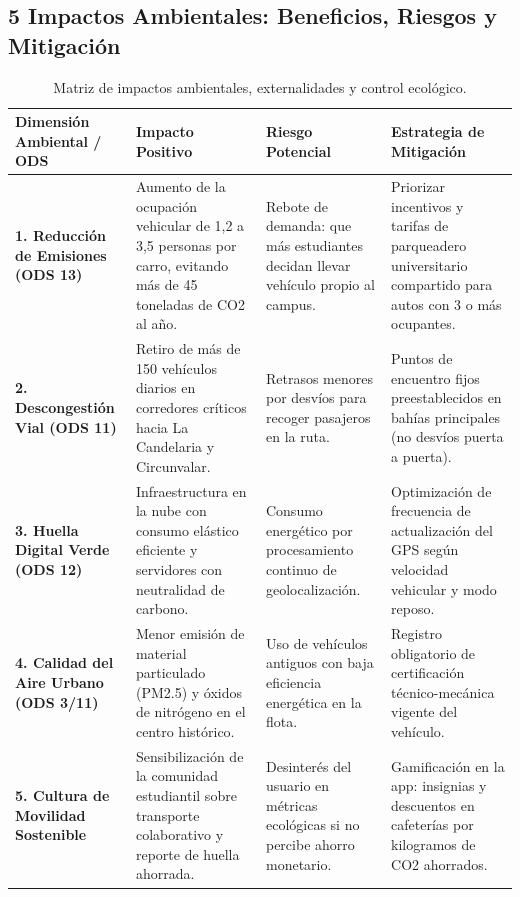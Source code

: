 \documentclass[11pt,a4paper]{article}
\begin{document}
\subsection{5 Impactos Ambientales: Beneficios, Riesgos y Mitigación}

\begin{table}[h!]
\centering
\scriptsize
\begin{tabularx}{\textwidth}{p{3.2cm} p{4.2cm} p{3.5cm} X}
\toprule
\textbf{Dimensión Ambiental / ODS} & \textbf{Impacto Positivo} & \textbf{Riesgo Potencial} & \textbf{Estrategia de Mitigación} \\
\midrule
\textbf{1. Reducción de Emisiones (ODS 13)} & Aumento de la ocupación vehicular de 1,2 a 3,5 personas por carro, evitando más de 45 toneladas de CO2 al año. & Rebote de demanda: que más estudiantes decidan llevar vehículo propio al campus. & Priorizar incentivos y tarifas de parqueadero universitario compartido para autos con 3 o más ocupantes. \\
\midrule
\textbf{2. Descongestión Vial (ODS 11)} & Retiro de más de 150 vehículos diarios en corredores críticos hacia La Candelaria y Circunvalar. & Retrasos menores por desvíos para recoger pasajeros en la ruta. & Puntos de encuentro fijos preestablecidos en bahías principales (no desvíos puerta a puerta). \\
\midrule
\textbf{3. Huella Digital Verde (ODS 12)} & Infraestructura en la nube con consumo elástico eficiente y servidores con neutralidad de carbono. & Consumo energético por procesamiento continuo de geolocalización. & Optimización de frecuencia de actualización del GPS según velocidad vehicular y modo reposo. \\
\midrule
\textbf{4. Calidad del Aire Urbano (ODS 3/11)} & Menor emisión de material particulado (PM2.5) y óxidos de nitrógeno en el centro histórico. & Uso de vehículos antiguos con baja eficiencia energética en la flota. & Registro obligatorio de certificación técnico-mecánica vigente del vehículo. \\
\midrule
\textbf{5. Cultura de Movilidad Sostenible} & Sensibilización de la comunidad estudiantil sobre transporte colaborativo y reporte de huella ahorrada. & Desinterés del usuario en métricas ecológicas si no percibe ahorro monetario. & Gamificación en la app: insignias y descuentos en cafeterías por kilogramos de CO2 ahorrados. \\
\bottomrule
\end{tabularx}
\caption{Matriz de impactos ambientales, externalidades y control ecológico.}
\end{table}
\end{document}
